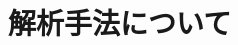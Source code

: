 \documentclass[../thesis]{subfiles}
\begin{document}
\renewcommand{\prechaptername}{付録}
\renewcommand{\postchaptername}{}
\renewcommand{\thechapter}{\Alph{chapter}}
\setcounter{chapter}{0}

\chapter{解析手法について}
\end{document}
